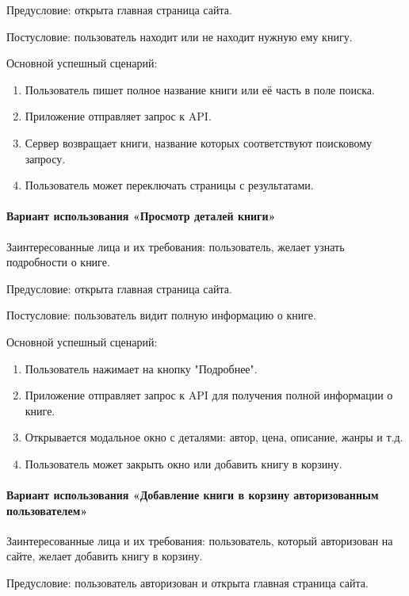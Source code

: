 Предусловие: открыта главная страница сайта.

Постусловие: пользователь находит или не находит нужную ему книгу.

Основной успешный сценарий:

\begin{enumerate}
	\item Пользователь пишет полное название книги или её часть в поле поиска.
	\item Приложение отправляет запрос к API. 
	\item Сервер возвращает книги, название которых соответствуют поисковому запросу.
	\item Пользователь может переключать страницы с результатами.
\end{enumerate}


\paragraph{Вариант использования «Просмотр деталей книги» }

Заинтересованные лица и их требования: пользователь, желает узнать подробности о книге.

Предусловие: открыта главная страница сайта.

Постусловие: пользователь видит полную информацию о книге.

Основной успешный сценарий:

\begin{enumerate}
	\item Пользователь нажимает на кнопку "Подробнее".
	\item Приложение отправляет запрос к API для получения полной информации о книге.
	\item Открывается модальное окно с деталями: автор, цена, описание, жанры и т.д.
	\item Пользователь может закрыть окно или добавить книгу в корзину.
\end{enumerate}


\paragraph{Вариант использования «Добавление книги в корзину авторизованным пользователем»}

Заинтересованные лица и их требования: пользователь, который авторизован на сайте, желает добавить книгу в корзину.

Предусловие: пользователь авторизован и открыта главная страница сайта.

